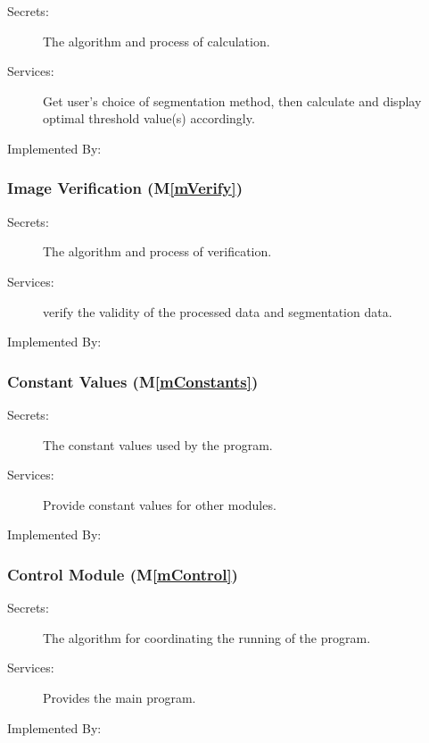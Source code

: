 \documentclass[12pt, titlepage]{article}
\newcommand{\mref}[1]{M\ref{#1}}
\begin{document}
\begin{description}
\item[Secrets:]The algorithm and process of calculation.
\item[Services:]Get user's choice of segmentation method, then calculate and
display optimal threshold value(s) accordingly.

\item[Implemented By:] \progname{}
\end{description}

\subsubsection{Image Verification (\mref{mVerify})}

\begin{description}
\item[Secrets:]The algorithm and process of verification.
\item[Services:]verify the validity of the processed data and segmentation
data.\item[Implemented By:] \progname{}
\end{description}

\subsubsection{Constant Values (\mref{mConstants})}

\begin{description}
\item[Secrets:]The constant values used by the program.
\item[Services:]Provide constant values for other modules.
\item[Implemented By:] \progname{}
\end{description}

\subsubsection{Control Module (\mref{mControl})}

\begin{description}
\item[Secrets:]The algorithm for coordinating the running of the program.
\item[Services:]Provides the main program.
\item[Implemented By:] \progname{}
\end{description}
\end{document}
